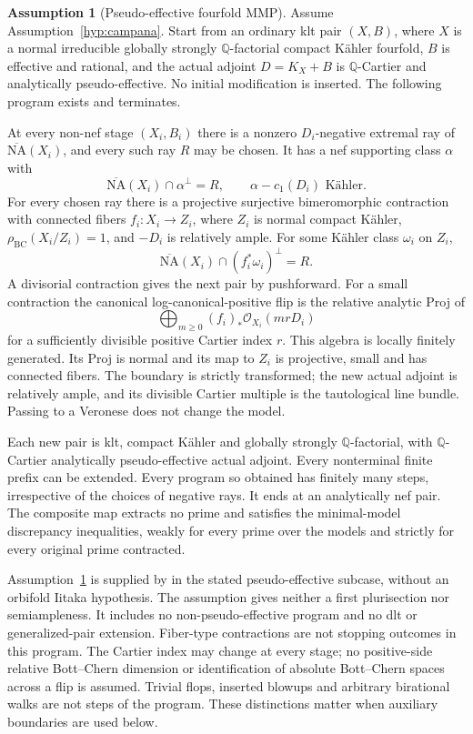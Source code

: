 \documentclass[11pt,letterpaper]{article}
\theoremstyle{definition}
\newtheorem{assumption}[theorem]{Assumption}
\theoremstyle{remark}
\begin{document}
\begin{assumption}[Pseudo-effective fourfold MMP]
\label{hyp:mmp}
Assume Assumption~\ref{hyp:campana}. Start from an ordinary klt pair
\((X,B)\), where \(X\) is a normal irreducible globally strongly
\(\mathbb{Q}\)-factorial compact K\"ahler fourfold, \(B\) is effective
and rational, and the actual adjoint \(D=K_X+B\) is
\(\mathbb{Q}\)-Cartier and analytically pseudo-effective. No initial
modification is inserted. The following program exists and
terminates.

At every non-nef stage \((X_i,B_i)\) there is a nonzero
\(D_i\)-negative extremal ray of \(\overline{\mathrm{NA}}(X_i)\), and every such
ray \(R\) may be chosen. It has a nef supporting class \(\alpha\)
with
\[
 \overline{\mathrm{NA}}(X_i)\cap\alpha^\perp=R,
 \qquad \alpha-c_1(D_i)\text{ K\"ahler}.
\]
For every chosen ray there is a projective surjective bimeromorphic
contraction with connected fibers
\(f_i:X_i\to Z_i\), where \(Z_i\) is normal compact K\"ahler,
\(\rho_{\mathrm{BC}}(X_i/Z_i)=1\), and \(-D_i\) is relatively ample.
For some K\"ahler class \(\omega_i\) on \(Z_i\),
\[
 \overline{\mathrm{NA}}(X_i)\cap(f_i^*\omega_i)^\perp=R.
\]
A divisorial contraction gives the next pair by pushforward. For a
small contraction the canonical log-canonical-positive flip is the
relative analytic Proj of
\[
 \bigoplus_{m\ge0}(f_i)_*\mathcal{O}_{X_i}(mrD_i)
\]
for a sufficiently divisible positive Cartier index \(r\). This
algebra is locally finitely generated. Its Proj is normal and its
map to \(Z_i\) is projective, small and has connected fibers. The
boundary is strictly transformed; the new actual adjoint is
relatively ample, and its divisible Cartier multiple is the
tautological line bundle. Passing to a Veronese does not change the
model.

Each new pair is klt, compact K\"ahler and globally strongly
\(\mathbb{Q}\)-factorial, with \(\mathbb{Q}\)-Cartier analytically
pseudo-effective actual adjoint. Every nonterminal finite prefix
can be extended. Every program so obtained has finitely many steps,
irrespective of the choices of negative rays. It ends at an
analytically nef pair. The composite map extracts no prime and
satisfies the minimal-model discrepancy inequalities, weakly for
every prime over the models and strictly for every original prime
contracted.
\end{assumption}

Assumption~\ref{hyp:mmp} is supplied by
\cite[Theorem~6.20; Proposition~3.4 and its proof]{GrantMMP}
in the stated pseudo-effective subcase, without an orbifold Iitaka
hypothesis. The assumption gives neither a first plurisection
nor semiampleness. It includes no non-pseudo-effective program and
no dlt or generalized-pair extension. Fiber-type contractions are
not stopping outcomes in this program. The Cartier index may change
at every stage; no positive-side relative Bott--Chern dimension or
identification of absolute Bott--Chern spaces across a flip is
assumed. Trivial flops, inserted blowups and arbitrary birational
walks are not steps of the program. These distinctions matter when
auxiliary boundaries are used below.
\end{document}
